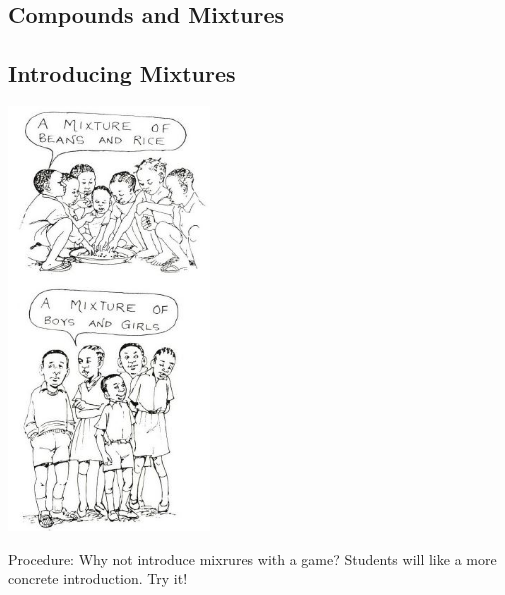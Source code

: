 \begin{multicols}{2}
\vfill
\columnbreak


\section*{Compounds and Mixtures}


\subsection{Introducing Mixtures}

\begin{center}
\includegraphics[width=0.4\textwidth]{./img/source/intro-mixtures.jpg}
\end{center}

\begin{description*}
\item[Procedure:]{Why not introduce mixrures with a
game? Students will like a more concrete
introduction. Try it!}
\end{description*}


\end{multicols}
